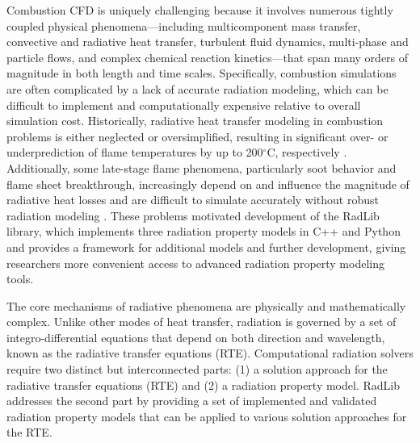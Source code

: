 \documentclass[preprint,12pt]{elsarticle}
\begin{document}
Combustion CFD is uniquely challenging because it involves numerous tightly coupled physical phenomena---including multicomponent mass transfer, convective and radiative heat transfer, turbulent fluid dynamics, multi-phase and particle flows, and complex chemical reaction kinetics---that span many orders of magnitude in both length and time scales. Specifically, combustion simulations are often complicated by a lack of accurate radiation modeling, which can be difficult to implement and computationally expensive relative to overall simulation cost. Historically, radiative heat transfer modeling in combustion problems is either neglected or oversimplified, resulting in significant over- or underprediction of flame temperatures by up to 200$^{\circ}$C, respectively \citep{Modest_2016}. Additionally, some late-stage flame phenomena, particularly soot behavior and flame sheet breakthrough, increasingly depend on and influence the magnitude of radiative heat losses and are difficult to simulate accurately without robust radiation modeling \cite{Modest_2013}. These problems motivated development of the RadLib library, which implements three radiation property models in C++ and Python and provides a framework for additional models and further development, giving researchers more convenient access to advanced radiation property modeling tools. 
%

The core mechanisms of radiative phenomena are physically and mathematically complex. Unlike other modes of heat transfer, radiation is governed by a set of integro-differential equations that depend on both direction and wavelength, known as the radiative transfer equations (RTE). Computational radiation solvers require two distinct but interconnected parts: (1) a solution approach for the radiative transfer equations (RTE) and (2) a radiation property model. RadLib addresses the second part by providing a set of implemented and validated radiation property models that can be applied to various solution approaches for the RTE. 
\end{document}
